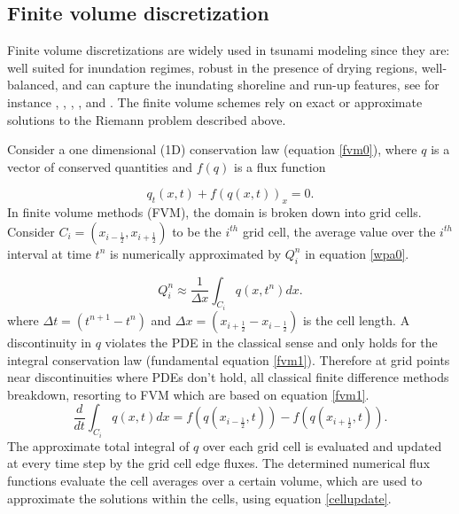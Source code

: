 \documentclass[10pt,a4paper]{article}
\begin{document}
	\subsection{Finite volume discretization}
	Finite volume discretizations are widely used in tsunami modeling since they are: well suited for inundation regimes, robust in the presence of drying regions, well-balanced, and can capture the inundating shoreline and run-up features, see for instance   \citet{ge:2008,ge:2011,george2006finite}, \citet{be-ge-le-ma:2011}, \citet{bi2014finite}, \citet{leveque2002finite}, and \citet{ba-le-mi-ro:2003}. The finite volume schemes rely on exact or approximate solutions to the Riemann problem described above.  
	
	Consider a one dimensional (1D) conservation law  (equation \eqref{fvm0}),  where $q$ is a vector of conserved quantities and $f(q)$ is a flux function
	
	\begin{equation}
		q_{t}(x,t) + f(q(x,t))_{x} = 0.
		\label{fvm0}
	\end{equation}	
	In finite volume methods (FVM), the domain is broken down into grid cells. Consider $C_{i} = (x_{i-\frac{1}{2}},x_{i+\frac{1}{2}})$ to be the $i^{th}$ grid cell, the average value over the $i^{th}$ interval at time $t^{n}$ is numerically approximated by $Q_{i}^{n}$ in equation \eqref{wpa0}.
	
	\begin{equation}
		Q_{i}^{n} \approx \dfrac{1}{\Delta x} \int_{C_{i}}q(x,t^{n})dx.
		\label{wpa0}
	\end{equation}
	where $\Delta t = (t^{n+1} - t^{n})$ and  $\Delta x = (x_{i+\frac{1}{2}} - x_{i-\frac{1}{2}})$ is the cell length. A discontinuity in $q$ violates the PDE in the classical sense and only holds for the integral conservation law (fundamental equation \eqref{fvm1}). Therefore at grid points near discontinuities where PDEs don't hold, all classical finite difference methods breakdown, resorting to FVM which are based on equation \eqref{fvm1}. 	
	\begin{equation}
		\frac{d}{dt} \int_{C_{i}} q(x,t)dx = f(q(x_{i-\frac{1}{2}},t)) -  f(q(x_{i+\frac{1}{2}},t)).
		\label{fvm1}
	\end{equation}	
	The approximate  total integral of $q$ over each grid cell is evaluated and updated at every time step by the grid cell edge fluxes. The determined numerical flux functions evaluate the  cell averages over a certain volume, which are used to approximate the solutions within the cells, using equation \eqref{cellupdate}.
	
\end{document}
